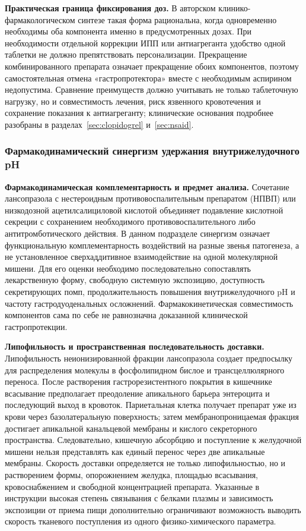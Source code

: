\documentclass[11pt,a4paper,notitlepage]{report}
\newcommand{\src}[1]{\unskip\space\cite{#1}}
\begin{document}
\textbf{Практическая граница фиксирования доз.} В авторском клинико-фармакологическом синтезе такая форма рациональна, когда одновременно необходимы оба компонента именно в предусмотренных дозах. При необходимости отдельной коррекции ИПП или антиагреганта удобство одной таблетки не должно препятствовать персонализации. Прекращение комбинированного препарата означает прекращение обоих компонентов, поэтому самостоятельная отмена «гастропротектора» вместе с необходимым аспирином недопустима. Сравнение преимуществ должно учитывать не только таблеточную нагрузку, но и совместимость лечения, риск язвенного кровотечения и сохранение показания к антиагреганту; клинические основания подробнее разобраны в разделах~\ref{sec:clopidogrel} и~\ref{sec:nsaid}.\src{fdctakeldalabel,cardioesc2024,agadepres}

\subsubsection{Фармакодинамический синергизм удержания внутрижелудочного pH}
\label{sec:ph-retention-synergy}

\textbf{Фармакодинамическая комплементарность и предмет анализа.} Сочетание лансопразола с нестероидным противовоспалительным препаратом (НПВП) или низкодозной ацетилсалициловой кислотой объединяет подавление кислотной секреции с сохранением необходимого противовоспалительного либо антитромботического действия. В данном подразделе синергизм означает функциональную комплементарность воздействий на разные звенья патогенеза, а не установленное сверхаддитивное взаимодействие на одной молекулярной мишени. Для его оценки необходимо последовательно сопоставлять лекарственную форму, свободную системную экспозицию, доступность секретирующих помп, продолжительность повышения внутрижелудочного pH и частоту гастродуоденальных осложнений. Фармакокинетическая совместимость компонентов сама по себе не равнозначна доказанной клинической гастропротекции.\src{fdcnaprapac,fdctakeldareview,misotrial,aspirin15}

\textbf{Липофильность и пространственная последовательность доставки.} Липофильность неионизированной фракции лансопразола создает предпосылку для распределения молекулы в фосфолипидном бислое и трансцеллюлярного переноса. После растворения гастрорезистентного покрытия в кишечнике всасывание предполагает преодоление апикального барьера энтероцита и последующий выход в кровоток. Париетальная клетка получает препарат уже из крови через базолатеральную поверхность; затем мембранопроницаемая фракция достигает апикальной канальцевой мембраны и кислого секреторного пространства. Следовательно, кишечную абсорбцию и поступление к желудочной мишени нельзя представлять как единый перенос через две апикальные мембраны. Скорость доставки определяется не только липофильностью, но и растворением формы, опорожнением желудка, площадью всасывания, кровоснабжением и свободной концентрацией препарата. Указанные в инструкции высокая степень связывания с белками плазмы и зависимость экспозиции от приема пищи дополнительно ограничивают возможность выводить скорость тканевого поступления из одного физико-химического параметра.\src{pharmalabel,molchem}
\end{document}
